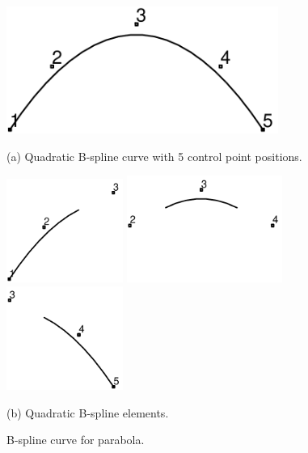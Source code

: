 \begin{figure}[b!]
\begin{center}

\includegraphics[width=3.5in]{figs/bspline_xy_5}

\centerline{(a) Quadratic B-spline curve with 5 control point
positions.}

\includegraphics[width=1.5in]{figs/belm_1}
\includegraphics[width=2.0in]{figs/belm_2}
\includegraphics[width=1.5in]{figs/belm_3}

\centerline{(b) Quadratic B-spline elements.}

\caption{B-spline curve for parabola.  \label{fig1bel} }

\end{center}
\end{figure}

